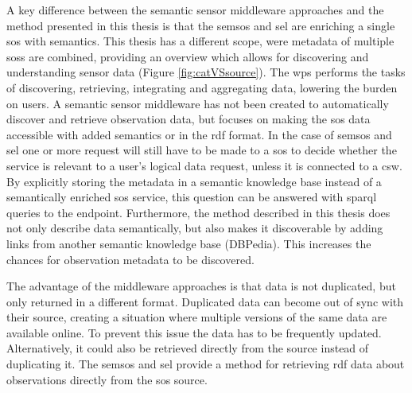 A key difference between the semantic sensor middleware approaches and the method presented in this thesis is that the \ac{semsos} and \ac{sel} are enriching a single \ac{sos} with semantics. This thesis has a different scope, were metadata of multiple \aclp{sos} are combined, providing an overview which allows for discovering and understanding sensor data (Figure \ref{fig:catVSsource}). The \ac{wps} performs the tasks of discovering, retrieving, integrating and aggregating data, lowering the burden on users. A semantic sensor middleware has not been created to automatically discover and retrieve observation data, but focuses on making the \ac{sos} data accessible with added semantics or in the \ac{rdf} format. In the case of \ac{semsos} and \ac{sel} one or more request will still have to be made to a \ac{sos} to decide whether the service is relevant to a user's logical data request, unless it is connected to a \ac{csw}. By explicitly storing the metadata in a semantic knowledge base instead of a semantically enriched \ac{sos} service, this question can be answered with \ac{sparql} queries to the endpoint. Furthermore, the method described in this thesis does not only describe data semantically, but also makes it discoverable by adding links from another semantic knowledge base (DBPedia). This increases the chances for observation metadata to be discovered.        

The advantage of the middleware approaches is that data is not duplicated, but only returned in a different format. Duplicated data can become out of sync with their source, creating a situation where multiple versions of the same data are available online. To prevent this issue the data has to be frequently updated. Alternatively, it could also be retrieved directly from the source instead of duplicating it. The \ac{semsos} and \ac{sel} provide a method for retrieving \ac{rdf} data about observations directly from the \ac{sos} source.


